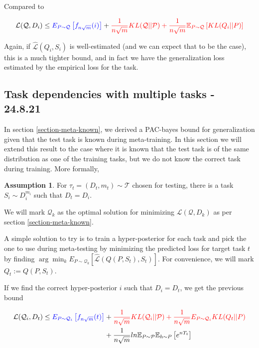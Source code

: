 \documentclass[letterpaper]{article}
\theoremstyle{definition}
\newtheorem{assumption}{Assumption}
\begin{document}
Compared to 

$$\mathcal{L}(\mathcal{Q}, D_i)\leq \textcolor{blue}{E_{P\sim \mathcal{Q}}  \left [ f_{n\sqrt{m}}(i)\right ]} + \textcolor{red}{\frac{1}{n\sqrt{m}}KL(\mathcal{Q}||\mathcal{P})+\frac{1}{n\sqrt{m}}\mathbb{E}_{P\sim \mathcal{Q}} \left [KL(Q_i||P)\right ]} $$

Again, if $\hat{\mathcal{L}}(Q_i,S_i)$ is well-estimated (and we can expect that to be the case), this is a much tighter bound, and in fact we have the generalization loss estimated by the empirical loss for the task.


\subsection{Task dependencies with multiple tasks - 24.8.21} \label{sec:bayes:multi}

In section \ref{section-meta-known}, we derived a PAC-bayes bound for generalization given that the test task is known during meta-training. In this section we will extend this result to the case where it is known that the test task is of the same distribution as one of the training tasks, but we do not know the correct task during training. More formally, 

\begin{assumption} \label{assumption-multitask}
	For $\tau_t=(D_t, m_t)\sim \mathcal{T}$ chosen for testing, there is a task $S_i\sim D_i^{m_i}$ such that $D_t=D_i$.
\end{assumption}

We will mark $\mathcal{Q}_k$ as the optimal solution for minimizing $\mathcal{L}(\mathcal{Q}, D_k)$ as per section \ref{section-meta-known}.

A simple solution to try is to train a hyper-posterior for each task and pick the one to use during meta-testing by minimizing the predicted loss for target task $t$ by finding $\arg\min_{k}E_{P\sim\mathcal{Q}_k}\left [\hat{\mathcal{L}}(Q(P,S_t), S_t)\right ]$.
For convenience, we will mark $Q_t:=Q(P,S_t)$.

If we find the correct hyper-posterior $i$ such that $D_i=D_t$, we get the previous bound

\begin{align*}
\begin{split}
\mathcal{L}(\mathcal{Q}_i, D_t)\leq \textcolor{blue}{ E_{P\sim \mathcal{Q}_i} \left [ f_{n\sqrt{m}}(t)\right ]} & + \textcolor{red}{\frac{1}{n\sqrt{m}} KL(\mathcal{Q}_i||\mathcal{P}) +\frac{1}{n\sqrt{m}}E_{P\sim \mathcal{Q}_i} KL(Q_t||P)} \\&+ \frac{1}{n\sqrt{m}} ln\mathbb{E}_{P\sim \mathcal{P}}\mathbb{E}_{h\sim P}\left [ e^{nT_t} \right ]
\end{split}
\end{align*}
\end{document}
